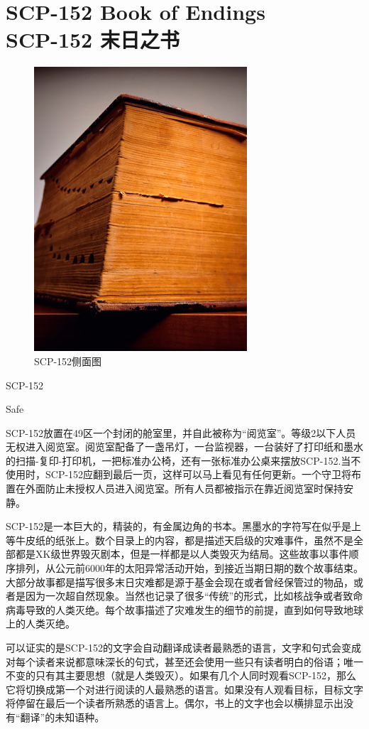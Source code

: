 \chapter[SCP-152 末日之书]{
    SCP-152 Book of Endings\\
    SCP-152 末日之书
}

\label{chap:SCP-152}

\begin{figure}[H]
    \centering
    \includegraphics[width=0.5\linewidth]{images/SCP.152.jpg}
    \caption*{SCP-152侧面图}
\end{figure}

SCP-152

Safe

SCP-152放置在49区一个封闭的舱室里，并自此被称为“阅览室”。等级2以下人员无权进入阅览室。阅览室配备了一盏吊灯，一台监视器，一台装好了打印纸和墨水的扫描-复印-打印机，一把标准办公椅，还有一张标准办公桌来摆放SCP-152.当不使用时，SCP-152应翻到最后一页，这样可以马上看见有任何更新。一个守卫将布置在外面防止未授权人员进入阅览室。所有人员都被指示在靠近阅览室时保持安静。

SCP-152是一本巨大的，精装的，有金属边角的书本。黑墨水的字符写在似乎是上等牛皮纸的纸张上。数个目录上的内容，都是描述天启级的灾难事件，虽然不是全部都是XK级世界毁灭剧本，但是一样都是以人类毁灭为结局。这些故事以事件顺序排列，从公元前6000年的太阳异常活动开始，到接近当期日期的数个故事结束。大部分故事都是描写很多末日灾难都是源于基金会现在或者曾经保管过的物品，或者是因为一次超自然现象。当然也记录了很多“传统”的形式，比如核战争或者致命病毒导致的人类灭绝。每个故事描述了灾难发生的细节的前提，直到如何导致地球上的人类灭绝。

可以证实的是SCP-152的文字会自动翻译成读者最熟悉的语言，文字和句式会变成对每个读者来说都意味深长的句式，甚至还会使用一些只有读者明白的俗语；唯一不变的只有其主要思想（就是人类毁灭）。如果有几个人同时观看SCP-152，那么它将切换成第一个对进行阅读的人最熟悉的语言。如果没有人观看目标，目标文字将停留在最后一个读者所熟悉的语言上。偶尔，书上的文字也会以横排显示出没有“翻译”的未知语种。

